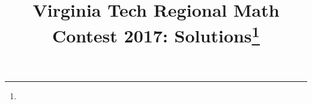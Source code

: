 \documentclass[10pt]{article}
\begin{document}
\title{Virginia Tech Regional Math Contest 2017: Solutions\footnote{\disclaimer}}
\author{\vspace{-2ex}}
\date{\vspace{-5ex}} %
\maketitle

%

%

%

%

%

%

%
\end{document}
